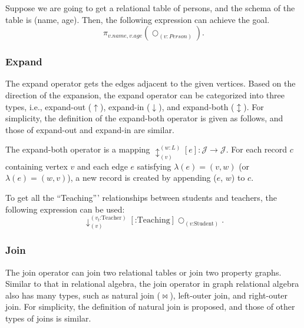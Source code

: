 \begin{example}
    Suppose we are going to get a relational table of persons, and the schema of the table is (name, age).
    Then, the following expression can achieve the goal.
    \begin{equation*}
        \pi_{v.name, v.age}(\bigcirc_{(v:Person)}).
    \end{equation*}
\end{example}

\subsubsection{Expand}

The expand operator gets the edges adjacent to the given vertices.
Based on the direction of the expansion, the expand operator can be categorized into three types, i.e., expand-out ($\uparrow$), expand-in ($\downarrow$), and expand-both ($\updownarrow$).
For simplicity, the definition of the expand-both operator is given as follows, and those of expand-out and expand-in are similar.

\begin{definition}
    The expand-both operator is a mapping $\updownarrow_{(v)}^{(w:L)}[e] : \mathcal{J} \rightarrow \mathcal{J}$.
    For each record $c$ containing vertex $v$ and each edge $e$ satisfying $\lambda(e) = (v, w)$ (or $\lambda(e) = (w, v)$), a new record is created by appending ($e$, $w$) to $c$.
\end{definition}

\begin{example}
    To get all the ``Teaching''' relationships between students and teachers, the following expression can be used:
    \begin{equation*}
        \downarrow_{(v)}^{(v_t\text{:Teacher})}[\text{:Teaching}]\bigcirc_{(v\text{:Student})}.
    \end{equation*}
\end{example}

\subsubsection{Join}

The join operator can join two relational tables or join two property graphs.
Similar to that in relational algebra, the join operator in graph relational algebra also has many types, such as natural join ($\Join$), left-outer join, and right-outer join.
For simplicity, the definition of natural join is proposed, and those of other types of joins is similar.

